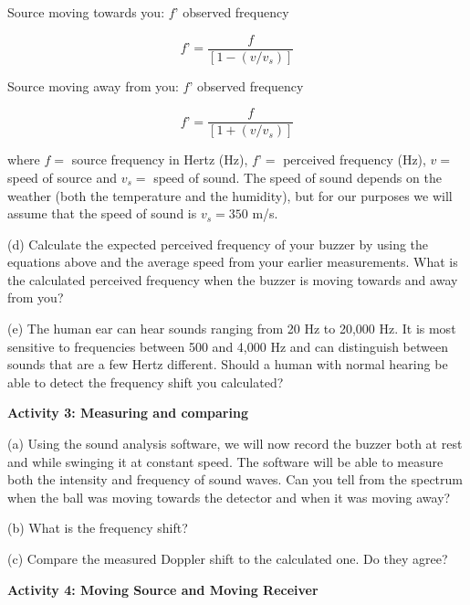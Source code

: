 Source moving towards you: $f’$ observed frequency

\begin{equation}
f’ =\frac{f}{[1 - (v/v_{s})]}
\end{equation}

Source moving away from you: $f’$ observed frequency

\begin{equation}
	f’ =\frac{f}{[1 + (v/v_{s})]}
\end{equation}

where $f =$ source frequency in Hertz (Hz), $f’ =$ perceived frequency (Hz), $v =$ speed of source
and $v_{s} =$ speed of sound. The speed of sound depends on the weather (both the temperature and the humidity), but for our purposes we will assume that the speed of sound is $v_{s} = 350$ m/s.

(d) Calculate the expected perceived frequency of your buzzer by using the equations above and the average speed from your earlier measurements. What is the calculated perceived frequency when the buzzer is moving towards and away from you?
\answerspace{30mm}

(e) The human ear can hear sounds ranging from 20 Hz to 20,000 Hz. It is most sensitive to frequencies between 500 and 4,000 Hz and can distinguish between sounds that are a few Hertz different. Should a human with normal hearing be able to detect the frequency shift you calculated?
\answerspace{30mm}

\textbf{Activity 3: Measuring and comparing}

(a) Using the sound analysis software, we will now record the buzzer both at rest and while swinging it at constant speed. The software will be able to measure both the intensity and frequency of sound waves. Can you tell from the spectrum when the ball was moving towards the detector and when it was moving away?
\answerspace{32mm}

(b) What is the frequency shift?
\answerspace{32mm}

(c) Compare the measured Doppler shift to the calculated one.  Do they agree?
\answerspace{32mm}


\pagebreak
\textbf{Activity 4: Moving Source and Moving Receiver}

